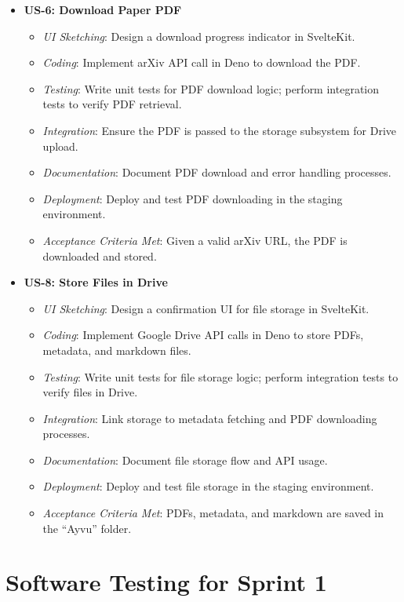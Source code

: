 \documentclass[12pt]{article}
\begin{document}
\begin{itemize}
  \item \textbf{US-6: Download Paper PDF}
    \begin{itemize}
      \item \textit{UI Sketching}: Design a download progress indicator in SvelteKit.
      \item \textit{Coding}: Implement arXiv API call in Deno to download the PDF.
      \item \textit{Testing}: Write unit tests for PDF download logic; perform integration tests to verify PDF retrieval.
      \item \textit{Integration}: Ensure the PDF is passed to the storage subsystem for Drive upload.
      \item \textit{Documentation}: Document PDF download and error handling processes.
      \item \textit{Deployment}: Deploy and test PDF downloading in the staging environment.
      \item \textit{Acceptance Criteria Met}: Given a valid arXiv URL, the PDF is downloaded and stored.
    \end{itemize}

  \item \textbf{US-8: Store Files in Drive}
    \begin{itemize}
      \item \textit{UI Sketching}: Design a confirmation UI for file storage in SvelteKit.
      \item \textit{Coding}: Implement Google Drive API calls in Deno to store PDFs, metadata, and markdown files.
      \item \textit{Testing}: Write unit tests for file storage logic; perform integration tests to verify files in Drive.
      \item \textit{Integration}: Link storage to metadata fetching and PDF downloading processes.
      \item \textit{Documentation}: Document file storage flow and API usage.
      \item \textit{Deployment}: Deploy and test file storage in the staging environment.
      \item \textit{Acceptance Criteria Met}: PDFs, metadata, and markdown are saved in the ``Ayvu'' folder.
    \end{itemize}
\end{itemize}

\section{Software Testing for Sprint 1}
\end{document}

